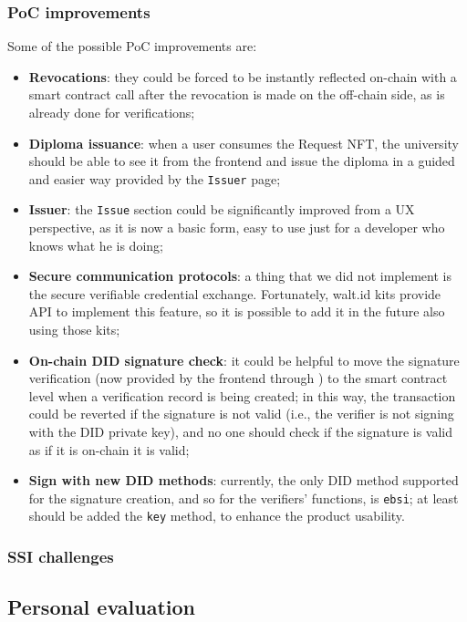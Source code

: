 \subsubsection{PoC improvements}
Some of the possible PoC improvements are:
\begin{itemize}
    \item \textbf{Revocations}: they could be forced to be instantly reflected on-chain
    with a smart contract call after the revocation is made on the off-chain side, as
    is already done for verifications;
    \item \textbf{Diploma issuance}: when a user consumes the Request NFT, the university
    should be able to see it from the frontend and issue the diploma in a guided and
    easier way provided by the \texttt{Issuer} page;
    \item \textbf{Issuer}: the \texttt{Issue} section could be significantly improved from
    a UX perspective, as it is now a basic form, easy to use just for a developer who
    knows what he is doing;
    \item \textbf{Secure communication protocols}: a thing that we did not implement is the
    secure verifiable credential exchange. Fortunately, walt.id kits provide API to
    implement this feature, so it is possible to add it in the future also using those kits;
    \item \textbf{On-chain DID signature check}: it could be helpful to move the signature 
    verification (now provided by the frontend through ) to the 
    smart contract level when a verification record is being created;
    in this way, the transaction could be reverted if the signature is not valid (i.e., 
    the verifier is not signing with the DID private key), and no one should check if 
    the signature is valid as if it is on-chain it is valid;
    \item \textbf{Sign with new DID methods}: currently, the only DID method supported 
    for the signature creation, and so for the verifiers' functions, is \texttt{ebsi}; 
    at least should be added the \texttt{key} method, to enhance the product usability.
\end{itemize}
\subsubsection{SSI challenges}

\subsection{Personal evaluation}
